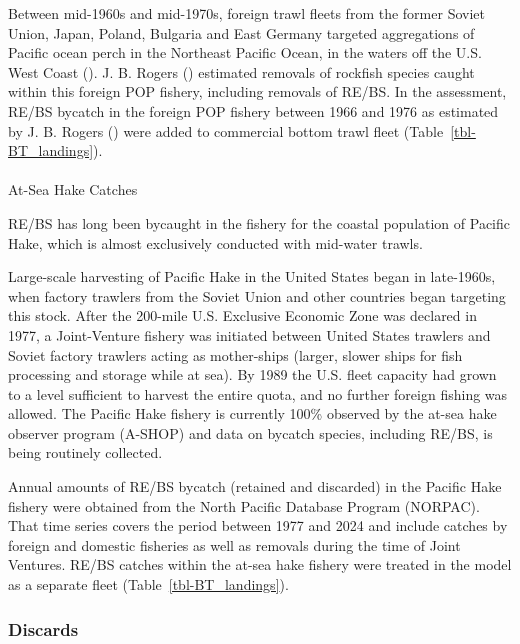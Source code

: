 \documentclass[
]{scrartcl}
\makeatletter
\let\oldparagraph\paragraph
\renewcommand{\paragraph}{
    \@ifstar
      \xxxParagraphStar
      \xxxParagraphNoStar
  }
\newcommand{\xxxParagraphStar}[1]{\oldparagraph*{#1}\mbox{}}
\newcommand{\xxxParagraphNoStar}[1]{\oldparagraph{#1}\mbox{}}
\makeatother
\begin{document}
Between mid-1960s and mid-1970s, foreign trawl fleets from the former
Soviet Union, Japan, Poland, Bulgaria and East Germany targeted
aggregations of Pacific ocean perch in the Northeast Pacific Ocean, in
the waters off the U.S. West Coast
(). J. B. Rogers ()
estimated removals of rockfish species caught within this foreign POP
fishery, including removals of RE/BS. In the assessment, RE/BS bycatch
in the foreign POP fishery between 1966 and 1976 as estimated by J. B.
Rogers () were added to
commercial bottom trawl fleet (Table~\ref{tbl-BT_landings}).

\paragraph{At-Sea Hake Catches}\label{at-sea-hake-catches}

RE/BS has long been bycaught in the fishery for the coastal population
of Pacific Hake, which is almost exclusively conducted with mid-water
trawls.

Large-scale harvesting of Pacific Hake in the United States began in
late-1960s, when factory trawlers from the Soviet Union and other
countries began targeting this stock. After the 200-mile U.S. Exclusive
Economic Zone was declared in 1977, a Joint-Venture fishery was
initiated between United States trawlers and Soviet factory trawlers
acting as mother-ships (larger, slower ships for fish processing and
storage while at sea). By 1989 the U.S. fleet capacity had grown to a
level sufficient to harvest the entire quota, and no further foreign
fishing was allowed. The Pacific Hake fishery is currently 100\%
observed by the at-sea hake observer program (A-SHOP) and data on
bycatch species, including RE/BS, is being routinely collected.

Annual amounts of RE/BS bycatch (retained and discarded) in the Pacific
Hake fishery were obtained from the North Pacific Database Program
(NORPAC). That time series covers the period between 1977 and 2024 and
include catches by foreign and domestic fisheries as well as removals
during the time of Joint Ventures. RE/BS catches within the at-sea hake
fishery were treated in the model as a separate fleet
(Table~\ref{tbl-BT_landings}).

\subsubsection{Discards}\label{discards}
\end{document}
